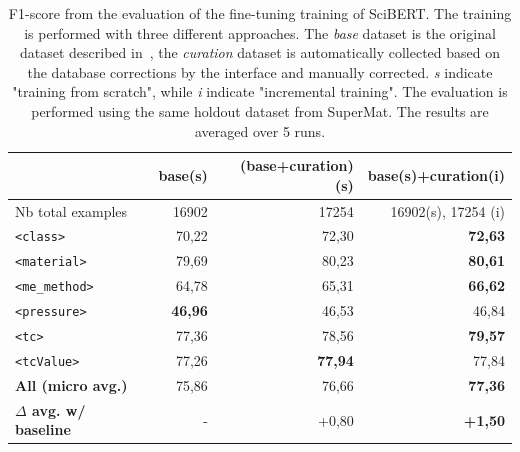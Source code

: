 \documentclass[a4paper]{article}
\begin{document}
\begin{table}[ht]
\centering\small
\caption{F1-score from the evaluation of the fine-tuning training of SciBERT. The training is performed with three different approaches. 
The \emph{base} dataset is the original dataset described in~\cite{lfoppiano2023automatic}, the \emph{curation} dataset is automatically collected based on the database corrections by the interface and manually corrected. \textit{s} indicate "training from scratch", while \textit{i} indicate "incremental training". 
The evaluation is performed using the same holdout dataset from SuperMat. 
The results are averaged over 5 runs. }
\begin{tabular}{lrrr}
\toprule
& \textbf{base}(s) & \textbf{(base+curation)(s)} & \textbf{base(s)+curation(i)} \\ 
\midrule
Nb total examples & 16902 & 17254 & 16902(s), 17254 (i)\\ 
\midrule
\texttt{<class>}        & 70,22             & 72,30             & \textbf{72,63} \\ 
\texttt{<material>}     & 79,69             & 80,23             & \textbf{80,61} \\ 
\texttt{<me\_method>}   & 64,78             & 65,31             & \textbf{66,62} \\ 
\texttt{<pressure>}     & \textbf{46,96}    & 46,53             & 46,84 \\ 
\texttt{<tc>}           & 77,36             & 78,56             & \textbf{79,57} \\ 
\texttt{<tcValue>}      & 77,26             & \textbf{77,94}    & 77,84 \\ 
\midrule
\textbf{All (micro avg.)} & 75,86           & 76,66             & \textbf{77,36} \\ 
\midrule
\textbf{$\Delta$ avg. w/ baseline}& -       & +0,80             & \textbf{+1,50} \\ 
\bottomrule
\end{tabular}
\label{tab:evaluation-curation-training}
\end{table}
\end{document}
